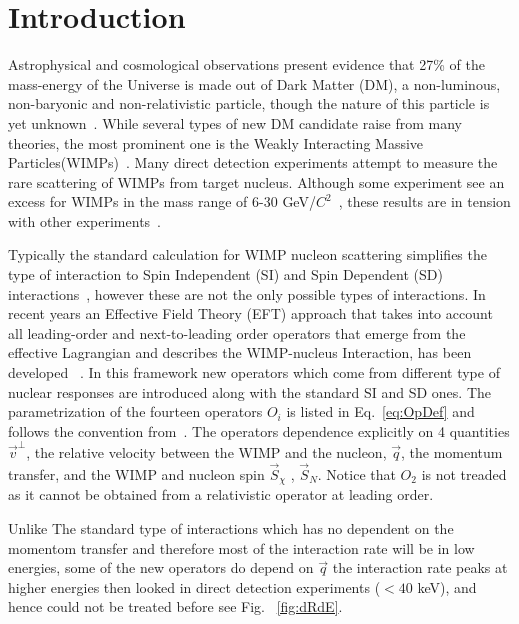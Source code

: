 \section{Introduction}

	Astrophysical and cosmological observations present evidence that 27\% of the mass-energy of the Universe is made out of Dark Matter (DM), a non-luminous, non-baryonic and non-relativistic particle, though the nature of this particle is yet unknown~\cite{Harvey1462}. While several types of new DM candidate raise from many theories, the most prominent one is the Weakly Interacting Massive Particles(WIMPs)~\cite{Bertone:2010zza}. Many  direct detection experiments attempt to measure the rare scattering of WIMPs from target nucleus. Although some experiment see an excess for WIMPs in the mass range of 6-30 GeV/$C^2$~\cite{DAMA,COGENT,CDMSlite,CREST}, these results are in tension with other experiments~\cite{xe100_run_combination,PANDAX,LUXnew}.
	
	 Typically the standard calculation for WIMP nucleon scattering simplifies the type of interaction to Spin Independent (SI) and Spin Dependent (SD) interactions~\cite{LEWIN}, however these are not the only possible types of interactions. In recent years an Effective Field Theory (EFT) approach that takes into account all leading-order and next-to-leading order operators that emerge from the effective Lagrangian and describes the WIMP-nucleus Interaction, has been developed ~\cite{Fitzpatrick:2012ib,Anand:MathTools,Fitzpatrick:MathTools}. In this framework new operators which come from different type of nuclear responses are introduced along with the standard SI and SD ones. The parametrization of the fourteen operators $O_i$ is listed in Eq.~\ref{eq:OpDef} and follows the convention from~\cite{Anand:MathTools}. The operators dependence explicitly on 4 quantities $\vec{v}^{\perp}$, the relative velocity between the WIMP and the nucleon, $\vec{q}$, the momentum transfer, and the WIMP and nucleon spin $\vec{S}_\chi$ , $\vec{S}_N$. Notice that $O_2$ is not treaded as it cannot be obtained from a relativistic operator at leading order.
	 
	    Unlike The standard type of interactions which has no dependent on the momentom transfer and therefore most of the interaction rate will be in low energies, some of the new operators do depend on $\vec{q}$ the interaction rate peaks at higher energies then looked in direct detection experiments ($< 40$ keV), and hence could not be treated before see Fig. ~\ref{fig:dRdE}.
	    
